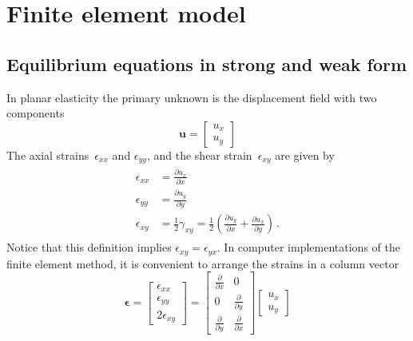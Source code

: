 \documentclass[11pt,a4paper]{article}
\newcommand{\fett}[1]{\boldsymbol{#1}}
\renewcommand{\vec}[1]{\fett{#1}}
\begin{document}
%
\section{Finite element model \label{s:model}}
%

%
\subsection{Equilibrium equations in strong and weak form}
%
In planar elasticity the primary unknown is the displacement field with two components 
%
\begin{equation}
	\vec u = 
	\begin{bmatrix}
	u_x \\
	u_y
	\end{bmatrix}
\end{equation}
%
%
The axial strains~$\epsilon_{xx} $ and $\epsilon_{yy}$,  and the shear strain~$\epsilon_{xy}$  are given by
%
\begin{align}
\begin{split}
	\epsilon_{xx} &= \frac{\partial u_x}{\partial x}  \\
	\epsilon_{yy} &= \frac{\partial u_y}{\partial y} \\
	\epsilon_{xy} &= \frac{1}{2} \gamma_{xy} =  \frac{1}{2} \left (\frac{ \partial u_y}{\partial x} + \frac{\partial u_x}{\partial y} \right ) \, .
\end{split}	
\end{align}
%
Notice that this definition implies $\epsilon_{xy}=\epsilon_{yx}$. In computer implementations of the finite element method, it is convenient to  arrange the strains in a column vector 
%
\begin{equation}
\vec \epsilon = 
\begin{bmatrix}
\epsilon_{xx} \\
\epsilon_{yy} \\
2\epsilon_{xy}
\end{bmatrix}
= 
\begin{bmatrix}
\frac{\partial }{\partial x} & 0 \\[0.3em]  
0 & \frac{\partial }{\partial y} \\[0.3em] 
\frac{\partial }{\partial y} & \frac{\partial }{\partial x}
\end{bmatrix}
\begin{bmatrix}
u_x \\
u_y
\end{bmatrix}
\end{equation}
\end{document}

